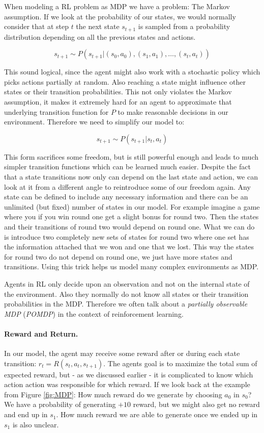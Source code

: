 When modeling a RL problem as MDP we have a problem: The Markov assumption. If we look at the probability of our states, we would normally consider that at step $t$ the next state $s_{t+1}$ is sampled from a probability distribution depending on all the previous states and actions.

\[s_{t+1} \sim P\left(s_{t+1}|(s_0, a_0), (s_1, a_1), \dots, (s_t, a_t)\right)\]

 This sound logical, since the agent might also work with a stochastic policy which picks actions partially at random. Also reaching a state might influence other states or their transition probabilities. This not only violates the Markov assumption, it makes it extremely hard for an agent to approximate that underlying transition function for $P$ to make reasonable decisions in our environment. Therefore we need to simplify our model to:  

 \[s_{t+1} \sim P(s_{t+1}|s_t, a_t)\]

This form sacrifices some freedom, but is still powerful enough and leads to much simpler transition functions which can be learned much easier. Despite the fact that a state transitions now only can depend on the last state and action, we can look at it from a different angle to reintroduce some of our freedom again. Any state can be defined to include any necessary information and there can be an unlimited (but fixed) number of states in our model. For example imagine a game where you if you win round one get a slight bonus for round two. Then the states and their transitions of round two would depend on round one. What we can do is introduce two completely new sets of states for round two where one set has the information attached that we won and one that we lost. This way the states for round two do not depend on round one, we just have more states and transitions. Using this trick helps us model many complex environments as MDP.

Agents in RL only decide upon an observation and not on the internal state of the environment. Also they normally do not know all states or their transition probabilities in the MDP. Therefore we often talk about a \textit{partially observable MDP} (\textit{POMDP}) in the context of reinforcement learning.

\paragraph{Reward and Return.}
In our model, the agent may receive some reward after or during each state transition: $r_t = R(s_t, a_t, s_{t+1})$. The agents goal is to maximize the total sum of expected reward, but - as we discussed earlier - it is complicated to know which action action was responsible for which reward. If we look back at the example from Figure \ref{fig:MDP}: How much reward do we generate by choosing $a_0$ in $s_0$? We have a probability of generating $+10$ reward, but we might also get no reward and end up in $s_1$. How much reward we are able to generate once we ended up in $s_1$ is also unclear.

